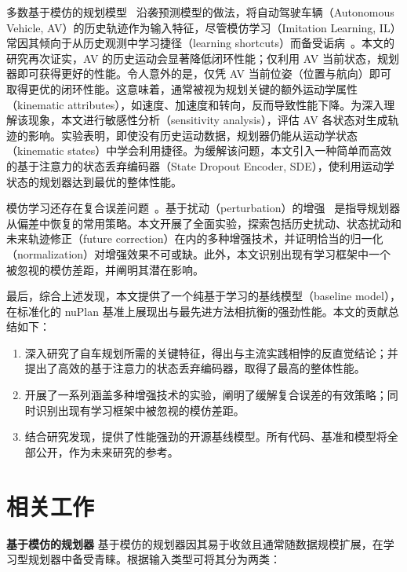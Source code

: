 \documentclass[letterpaper, 10 pt, conference]{ieeeconf}  %
\renewcommand{\paragraph}[1]{\vspace{1.25mm}\noindent\textbf{#1}}
\begin{document}
多数基于模仿的规划模型~\cite{zhou2021exploring, scheel2022urban,cheng2022mpnp,pini2023safepathnet,vitelli2022safetynet,huang2023gameformer,huang2023dipp} 沿袭预测模型的做法，将自动驾驶车辆（Autonomous Vehicle, AV）的历史轨迹作为输入特征，尽管模仿学习（Imitation Learning, IL）常因其倾向于从历史观测中学习捷径（learning shortcuts）而备受诟病~\cite{bansal2018chauffeurnet, muller2005offroad, wang2019monocular,wen2020fighting}。本文的研究再次证实，AV 的历史运动会显著降低闭环性能；仅利用 AV 当前状态，规划器即可获得更好的性能。令人意外的是，仅凭 AV 当前位姿（位置与航向）即可取得更优的闭环性能。这意味着，通常被视为规划关键的额外运动学属性（kinematic attributes），如速度、加速度和转向，反而导致性能下降。为深入理解该现象，本文进行敏感性分析（sensitivity analysis），评估 AV 各状态对生成轨迹的影响。实验表明，即使没有历史运动数据，规划器仍能从运动学状态（kinematic states）中学会利用捷径。为缓解该问题，本文引入一种简单而高效的基于注意力的状态丢弃编码器（State Dropout Encoder, SDE），使利用运动学状态的规划器达到最优的整体性能。

模仿学习还存在复合误差问题~\cite{ross2011reduction}。基于扰动（perturbation）的增强~\cite{bansal2018chauffeurnet,zhou2021exploring,vitelli2022safetynet} 是指导规划器从偏差中恢复的常用策略。本文开展了全面实验，探索包括历史扰动、状态扰动和未来轨迹修正（future correction）在内的多种增强技术，并证明恰当的归一化（normalization）对增强效果不可或缺。此外，本文识别出现有学习框架中一个被忽视的模仿差距，并阐明其潜在影响。

最后，综合上述发现，本文提供了一个纯基于学习的基线模型（baseline model），在标准化的 nuPlan 基准上展现出与最先进方法相抗衡的强劲性能。本文的贡献总结如下：
\begin{enumerate}
    \item 深入研究了自车规划所需的关键特征，得出与主流实践相悖的反直觉结论；并提出了高效的基于注意力的状态丢弃编码器，取得了最高的整体性能。
    \item 开展了一系列涵盖多种增强技术的实验，阐明了缓解复合误差的有效策略；同时识别出现有学习框架中被忽视的模仿差距。
    \item 结合研究发现，提供了性能强劲的开源基线模型。所有代码、基准和模型将全部公开，作为未来研究的参考。
\end{enumerate}

\section{相关工作}

\paragraph{基于模仿的规划器}
基于模仿的规划器因其易于收敛且通常随数据规模扩展，在学习型规划器中备受青睐。根据输入类型可将其分为两类：
\end{document}
